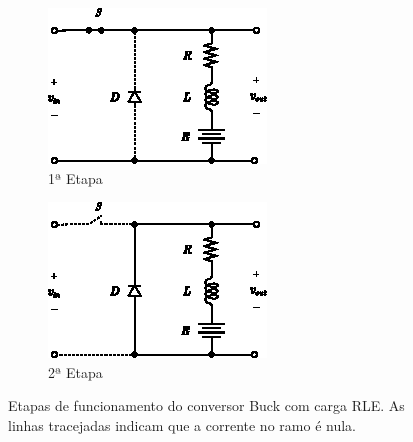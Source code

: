 \begin{figure}[H]
  \captionsetup{justification=centering}
  \centering
  \begin{subfigure}[t]{0.33\textwidth}
    \centering
    \includegraphics[width=\textwidth]{figuras/buck_converter_rle_s1.eps}
    \caption{1ª Etapa}
    \label{fig:buck_converter_rle_s1}
  \end{subfigure}
  \hfil
  \begin{subfigure}[t]{0.33\textwidth}
    \centering
    \includegraphics[width=\textwidth]{figuras/buck_converter_rle_s2.eps}
    \caption{2ª Etapa}
    \label{fig:buck_converter_rle_s2}
  \end{subfigure}
  \caption{Etapas de funcionamento do conversor Buck com carga RLE. As linhas tracejadas indicam que a corrente no ramo é nula.}
\end{figure}

